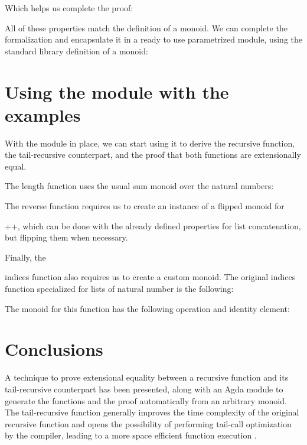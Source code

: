 \documentclass{cys}
\newcommand*{\SavedLstInline}{}
\DeclareRobustCommand*{\lstinline}{%
  \ifmmode
    \let\SavedBGroup\bgroup
    \def\bgroup{%
      \let\bgroup\SavedBGroup
      \hbox\bgroup
    }%
  \fi
  \SavedLstInline
  }
\begin{document}
Which helps us complete the proof:



All of these properties match the definition of a monoid. We can complete the
formalization and encapsulate it in a ready to use parametrized module, using the
standard library definition of a monoid:



\section{Using the module with the examples}

With the module in place, we can start using it to derive the recursive function, the
tail-recursive counterpart, and the proof that both functions are extensionally equal.

The length function uses the usual sum monoid over the natural numbers:



The reverse function requires us to create an instance of a flipped monoid for
\lstinline{++}, which can be done with the already defined properties for list
concatenation, but flipping them when necessary.



Finally, the \lstinline{indices} function also requires us to create a custom monoid. The
original indices function specialized for lists of natural number is the following:



The monoid for this function has the following operation and identity element:



\section{Conclusions}

A technique to prove extensional equality between a recursive function and its
tail-recursive counterpart has been presented, along with an Agda module to generate the
functions and the proof automatically from an arbitrary monoid. The tail-recursive
function generally improves the time complexity of the original recursive function and
opens the possibility of performing tail-call optimization by the compiler, leading to a
more space efficient function execution
\cite{bauer2003compilation,rubio2017introduction}.
\end{document}
